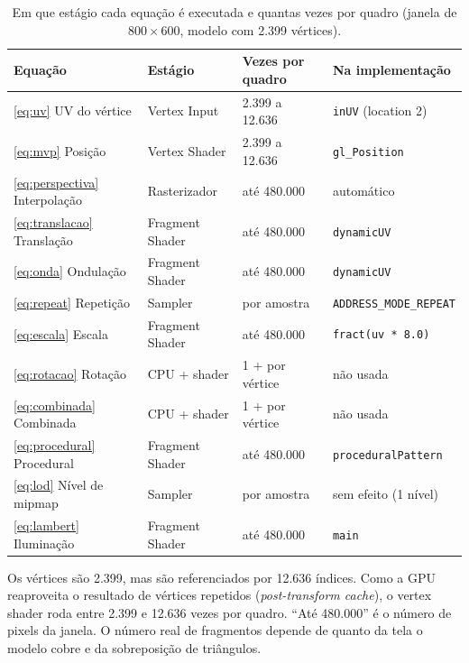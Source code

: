 \begin{table}[H]
\centering
\caption{Em que estágio cada equação é executada e quantas vezes por quadro (janela de \(800\times600\), modelo com 2.399 vértices).}
\label{tab:equacoes-estagios}
\small
\begin{tabular}{p{3.6cm}p{3.4cm}p{3.1cm}p{3.6cm}}
\toprule
\textbf{Equação} & \textbf{Estágio} & \textbf{Vezes por quadro} & \textbf{Na implementação} \\
\midrule
\eqref{eq:uv} UV do vértice & Vertex Input & 2.399 a 12.636 & \texttt{inUV} (location 2) \\
\eqref{eq:mvp} Posição & Vertex Shader & 2.399 a 12.636 & \texttt{gl\_Position} \\
\eqref{eq:perspectiva} Interpolação & Rasterizador & até 480.000 & automático \\
\eqref{eq:translacao} Translação & Fragment Shader & até 480.000 & \texttt{dynamicUV} \\
\eqref{eq:onda} Ondulação & Fragment Shader & até 480.000 & \texttt{dynamicUV} \\
\eqref{eq:repeat} Repetição & Sampler & por amostra & \texttt{ADDRESS\_MODE\_REPEAT} \\
\eqref{eq:escala} Escala & Fragment Shader & até 480.000 & \texttt{fract(uv * 8.0)} \\
\eqref{eq:rotacao} Rotação & CPU + shader & 1 + por vértice & não usada \\
\eqref{eq:combinada} Combinada & CPU + shader & 1 + por vértice & não usada \\
\eqref{eq:procedural} Procedural & Fragment Shader & até 480.000 & \texttt{proceduralPattern} \\
\eqref{eq:lod} Nível de mipmap & Sampler & por amostra & sem efeito (1 nível) \\
\eqref{eq:lambert} Iluminação & Fragment Shader & até 480.000 & \texttt{main} \\
\bottomrule
\end{tabular}
\end{table}

Os vértices são 2.399, mas são referenciados por 12.636 índices. Como a GPU reaproveita o resultado de vértices repetidos (\textit{post-transform cache}), o vertex shader roda entre 2.399 e 12.636 vezes por quadro. ``Até 480.000'' é o número de pixels da janela. O número real de fragmentos depende de quanto da tela o modelo cobre e da sobreposição de triângulos.
